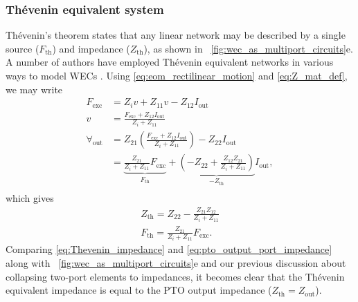 \documentclass[5p,times]{elsarticle}
\begin{document}
\subsubsection{Th\'{e}venin equivalent system}\label{sec:thevenin_equivalent_system}
Th\'{e}venin's theorem \cite{Thevenin:1883aa} states that any linear network may be described by a single source ($F_{\textrm{th}}$) and impedance ($Z_{\textrm{th}}$), as shown in \figurename~\ref{fig:wec_as_multiport_circuits}e.
A number of authors have employed Th\'{e}venin equivalent networks in various ways to model WECs \cite{McCabe:2024aa,Bacelli:2021aa,Blanco:2019aa,Bubbar:2018aa,Lewis:2013aa}.
Using \eqref{eq:eom_rectilinear_motion} and \eqref{eq:Z_mat_def}, we may write
%
\begin{equation}
        \nonumber
        \begin{split}
                F_{\textrm{exc}} &= Z_i v + Z_{11} v - Z_{12}I_{\textrm{out}} \\
                v &= \frac{F_{\textrm{exc}} + Z_{12}I_{\textrm{out}} }{Z_i + Z_{11}} \\[0.5em]
                \forall_{\textrm{out}}  &= Z_{21}\left(\frac{F_{\textrm{exc}} + Z_{12}I_{\textrm{out}} }{Z_i + Z_{11}}\right) - Z_{22}I_{\textrm{out}} \\
                &= \underbrace{\frac{Z_{21}}{Z_i + Z_{11}} F_\textrm{exc}}_{F_{\textrm{th}}} + \underbrace{\left( - Z_{22} + \frac{Z_{12}Z_{21}}{Z_i + Z_{11}}\right)}_{-Z_\textrm{th}} I_{\textrm{out}} , \\
        \end{split}
\end{equation}
%
which gives
%
\begin{subequations}
        \begin{gather}
                Z_{\textrm{th}} = Z_{22} - \frac{Z_{21} Z_{12}}{Z_{i} + Z_{11}} \label{eq:Thevenin_impedance} \\
                F_{\textrm{th}} = \frac{Z_{21}}{Z_i + Z_{11}}F_{\textrm{exc}} . \label{eq:Thevenin_force}
        \end{gather}
\end{subequations}
%
Comparing \eqref{eq:Thevenin_impedance} and \eqref{eq:pto_output_port_impedance} along with \figurename~\ref{fig:wec_as_multiport_circuits}e and our previous discussion about collapsing two-port elements to impedances, it becomes clear that the Th\'{e}venin equivalent impedance is equal to the PTO output impedance ($Z_{\textrm{th}} = Z_{\textrm{out}}$).
\end{document}
